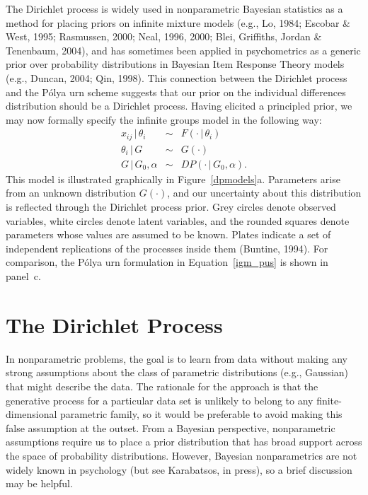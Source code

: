 \documentclass[authoryear]{elsarticle}
\newcommand{\condon}{\,|\,}
\newcommand{\panel}[1]{#1}
\begin{document}
The Dirichlet process is widely used in nonparametric Bayesian statistics as
a method for placing priors on infinite mixture models (e.g., Lo, 1984;
Escobar \& West, 1995;  Rasmussen, 2000; Neal, 1996, 2000;
Blei, Griffiths, Jordan \& Tenenbaum, 2004), and has
sometimes been applied in psychometrics as a  generic prior over probability
distributions in Bayesian Item Response Theory models (e.g., Duncan, 2004;
Qin, 1998). This connection between the Dirichlet process and the P\'{o}lya urn
scheme suggests that our prior on the individual differences distribution
should be a Dirichlet process. Having elicited a principled prior, we may now
formally specify the infinite groups model in the following way:
\begin{equation}
        \label{igm}
        \begin{array}{rcl}
        x_{ij} \condon \theta_i & \sim & F(\cdot \condon \theta_i)\\
        \theta_i \condon G & \sim & G(\cdot) \\
        G \condon G_0, \alpha &\sim& DP(\cdot \condon G_0, \alpha).
        \end{array}
\end{equation}
This model is illustrated graphically in Figure~\ref{dpmodels}\panel{a}. Parameters
arise from an unknown distribution $G(\cdot)$, and our uncertainty about this
distribution is reflected through the Dirichlet process prior.
Grey circles denote
observed variables, white circles denote latent variables, and the rounded squares
denote parameters whose values are assumed to be known. Plates indicate a
set of independent replications of the processes inside them (Buntine, 1994).
For comparison, the P\'{o}lya urn formulation in Equation~\ref{igm_pus} is
shown in panel~c.

\section{The Dirichlet Process}

In nonparametric problems, the goal is to learn from data without making any
strong assumptions about the class of parametric distributions (e.g., Gaussian)
that might describe the data. The rationale for the approach is that the generative
process for a particular data set is unlikely to belong to any finite-dimensional parametric
family, so it would be preferable to avoid making this false assumption at the outset.
From a Bayesian perspective, nonparametric assumptions require us to place a prior
distribution that has broad support across the space of probability distributions.
However, Bayesian nonparametrics are not widely known in psychology (but see
Karabatsos, in press), so a brief discussion may be helpful.
\end{document}
